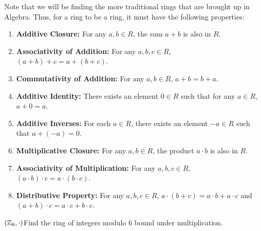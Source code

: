 Note that we will be finding the more traditional rings that are brought up in Algebra. Thus, for a ring to be a ring, it must have the following properties: \begin{enumerate}[label=\arabic*.]
    \item \textbf{Additive Closure:} For any \( a, b \in R \), the sum \( a + b \) is also in \( R \).
    \item \textbf{Associativity of Addition:} For any \( a, b, c \in R \), \( (a + b) + c = a + (b + c) \).
    \item \textbf{Commutativity of Addition:} For any \( a, b \in R \), \( a + b = b + a \).
    \item \textbf{Additive Identity:} There exists an element \( 0 \in R \) such that for any \( a \in R \), \( a + 0 = a \).
    \item \textbf{Additive Inverses:} For each \( a \in R \), there exists an element \( -a \in R \) such that \( a + (-a) = 0 \).
    \item \textbf{Multiplicative Closure:} For any \( a, b \in R \), the product \( a \cdot b \) is also in \( R \).
    \item \textbf{Associativity of Multiplication:} For any \( a, b, c \in R \), \( (a \cdot b) \cdot c = a \cdot (b \cdot c) \).
    \item \textbf{Distributive Property:} For any \( a, b, c \in R \), \( a \cdot (b + c) = a \cdot b + a \cdot c \) and \( (a + b) \cdot c = a \cdot c + b \cdot c \).
\end{enumerate}

\begin{example}
    {\((\mathbb{Z}_6, \cdot)\)}Find the ring of integers modulo 6 bound under multiplication.
\end{example}


